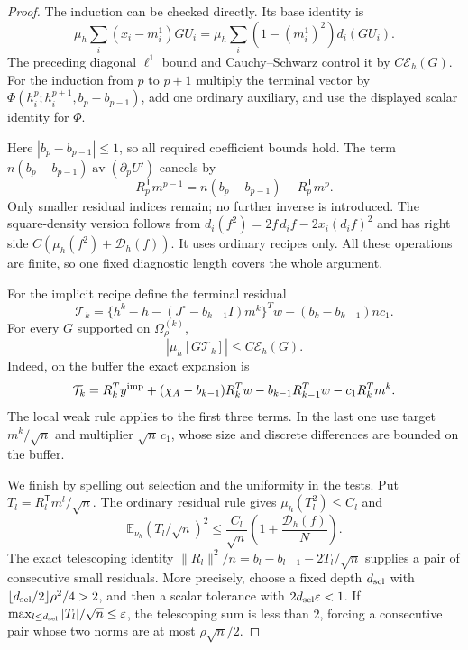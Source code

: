 \begin{proof}
The induction can be checked directly. Its base identity is
\[
 \mu_h\sum_i(x_i-m_i^1)GU_i
      =\mu_h\sum_i(1-(m_i^1)^2)d_i(GU_i).
\]
The preceding diagonal $\ell^1$ bound and Cauchy--Schwarz control it
by \(C\mathcal E_h(G)\).
For the induction from $p$ to $p+1$ multiply the terminal vector by
$\Phi(h_i^p;h_i^{p+1},b_p-b_{p-1})$, add one ordinary auxiliary,
and use the displayed scalar identity for $\Phi$.

Here $|b_p-b_{p-1}|\le1$, so all required coefficient bounds hold.
The term $n(b_p-b_{p-1})\operatorname{av}(\partial_pU')$ cancels by
\[
 R_p^{\mathsf T}m^{p-1}
       =n(b_p-b_{p-1})-R_p^{\mathsf T}m^p.
\]
Only smaller residual indices remain; no further inverse is introduced.
The square-density version follows from
$d_i(f^2)=2f\,d_if-2x_i(d_if)^2$ and has right side
$C(\mu_h(f^2)+\mathcal D_h(f))$.  It uses ordinary recipes only.
All these operations are finite, so one fixed diagnostic length
covers the whole argument.

For the implicit recipe define the terminal residual
\[
 \mathcal T_k=
 \{h^k-h-(J^\circ-b_{k-1}I)m^k\}^Tw
       -(b_k-b_{k-1})nc_1.
\]
For every \(G\) supported on \(\Omega_\rho^{(k)}\),
\[
 |\mu_h[G\mathcal T_k]|\le C\mathcal E_h(G).
\]
Indeed, on the buffer the exact expansion is
\[
 \mathcal T_k=
 R_k^Ty^{\rm imp}+(\chi_A-b_{k-1})R_k^Tw
 -b_{k-1}R_{k-1}^Tw-c_1R_k^Tm^k.
\]
The local weak rule applies to the first three terms. In the last
one use target \(m^k/\sqrt n\) and multiplier \(\sqrt n\,c_1\),
whose size and discrete differences are bounded on the buffer.

We finish by spelling out selection and the uniformity in the tests.
Put $T_l=R_l^{\mathsf T}m^l/\sqrt n$.  The ordinary residual rule gives
$\mu_h(T_l^2)\le C_l$ and
\[
 \mathbb E_{\nu_h}(T_l/\sqrt n)^2
 \le\frac{C_l}{\sqrt n}\left(1+\frac{\mathcal D_h(f)}N\right).
\]
The exact telescoping identity
$\|R_l\|^2/n=b_l-b_{l-1}-2T_l/\sqrt n$
supplies a pair of consecutive small residuals. More precisely,
choose a fixed depth \(d_{\rm sel}\) with
\(\lfloor d_{\rm sel}/2\rfloor\rho^2/4>2\), and then a scalar
tolerance with \(2d_{\rm sel}\varepsilon<1\). If
\(\max_{l\le d_{\rm sel}}|T_l|/\sqrt n\le\varepsilon\), the
telescoping sum is less than \(2\), forcing a consecutive pair
whose two norms are at most \(\rho\sqrt n/2\).


\end{proof}
